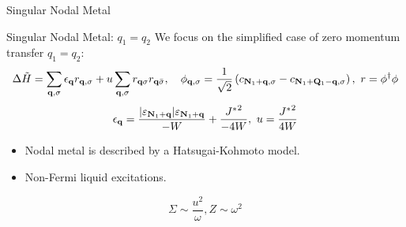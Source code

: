 \documentclass[10pt,aspectratio=169]{beamer}
\begin{document}
\begin{frame}{Singular Nodal Metal}
{\begin{minipage}{0.65\textwidth}
		\vspace{5pt}
	\end{minipage}
	}
	
\end{frame}

\begin{frame}{Singular Nodal Metal: \(q_1 = q_2\)}
	We focus on the simplified case of zero momentum transfer \(q_1=q_2\):
	\[ \Delta \tilde H = \sum_{{\bf q},\sigma}\epsilon_{{\bf q}}{r}_{{\bf q},\sigma} + u\sum_{{\bf q}, \sigma}r_{{\bf q} \sigma} r_{{\bf q} \bar\sigma},\quad\phi_{{\bf q}, \sigma} = \frac{1}{\sqrt 2}\left(c_{{\bf N}_1 + {\bf q},\sigma} - c_{{\bf N}_1 + {\bf Q}_1 - {\bf q}, \sigma}\right),~r = \phi^\dagger \phi \]
	\[\epsilon_{\bf q} = \frac{|\varepsilon_{{\bf N}_1 + {\bf q}}|\varepsilon_{{\bf N}_1 + {\bf q}}}{-W} + \frac{{J^*}^2}{-4W},~u = \frac{{J^*}^2}{4W}\]
	\begin{itemize}
		\item Nodal metal is described by a \alert{Hatsugai-Kohmoto model}.
		\item Non-Fermi liquid excitations.
	\end{itemize}
	\[\Sigma \sim \frac{u^2}{\omega}, Z \sim \omega^2\]
	
\end{frame}
\end{document}
